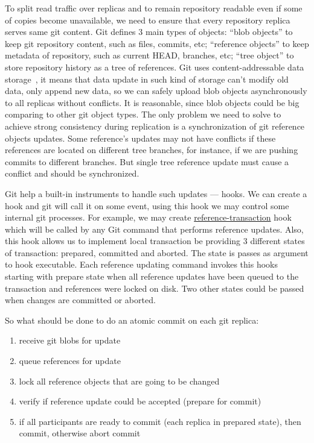 \documentclass[sigplan, screen, nonacm, 11pt]{acmart}
\begin{document}
To split read traffic over replicas and to remain repository readable even if some of copies become unavailable,
we need to ensure that every repository replica serves same git content.
Git defines 3 main types of objects: ``blob objects'' to keep git repository content, such as files, commits, etc;
``reference objects'' to keep metadata of repository, such as current HEAD, branches, etc; ``tree object'' to
store repository history as a tree of references. Git uses content-addressable
data storage~\cite{content-addressable-storage},
it means that data update in such kind of storage can't modify old data, only append new data, so we can safely
upload blob objects asynchronously to all replicas without conflicts.
It is reasonable, since blob objects could be big comparing to
other git object types. The only problem we need to solve to achieve strong consistency during replication
is a synchronization of git reference objects updates. Some reference's updates may not have conflicts if these references
are located on different tree branches, for instance, if we are pushing commits to different branches. But
single tree reference update must cause a conflict and should be synchronized.

Git help a built-in instruments to handle such updates --- hooks. We can create a hook and git will call it on some event,
using this hook we may control some internal git processes. For example, we may create
\href{https://git-scm.com/docs/githooks.html\#\_reference\_transaction}{reference-transaction} hook
which will be called by any Git command that performs reference updates. Also, this hook allows us to implement
local transaction be providing 3 different states of transaction: prepared, committed and aborted.
The state is passes as argument to hook executable.
Each reference updating command invokes this hooks starting with prepare state when all reference updates
have been queued to the transaction and references were locked on disk. Two other states could be passed
when changes are committed or aborted.

So what should be done to do an atomic commit on each git replica:
\begin{enumerate}
  \item receive git blobs for update
  \item queue references for update
  \item lock all reference objects that are going to be changed
  \item verify if reference update could be accepted (prepare for commit)
  \item if all participants are ready to commit (each replica in prepared state), then commit, otherwise abort commit
\end{enumerate}
\end{document}
